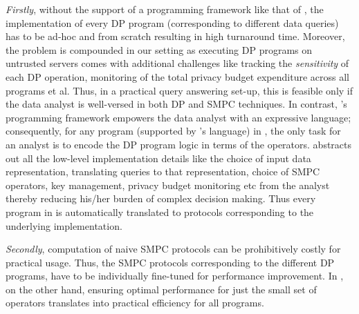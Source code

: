 \textit{Firstly}, without the support of a programming framework like that of \system, the implementation of every DP program (corresponding to different data queries) has to be ad-hoc and from scratch resulting in high turnaround time. Moreover, the problem is compounded in our setting as executing DP programs on untrusted servers comes with additional challenges like tracking the  \textit{sensitivity} of each DP operation, monitoring of the  total privacy budget expenditure across all programs et al. %
Thus, in a practical query answering set-up, this is feasible only if %
the data analyst is well-versed in both DP and SMPC techniques. In contrast, \system's programming framework empowers the data analyst
with an expressive language; consequently, for any program (supported by \system's language) in \system, the only task for an analyst is to encode the DP program logic in terms of the \system operators.  \system abstracts out all the low-level implementation details like the choice of input data representation, translating queries to that representation, choice of SMPC operators, key management, privacy budget monitoring etc
from the analyst thereby reducing his/her burden of complex decision making. Thus every program in \system is automatically translated to protocols corresponding to the underlying implementation. %

\textit{Secondly}, computation of naive SMPC protocols can be prohibitively costly for practical usage. Thus, the SMPC protocols corresponding to the different DP programs, have to be individually fine-tuned for performance improvement. In \system, on the other hand, %
ensuring optimal performance for just the small set of \system operators translates into practical efficiency for all \system programs. 

